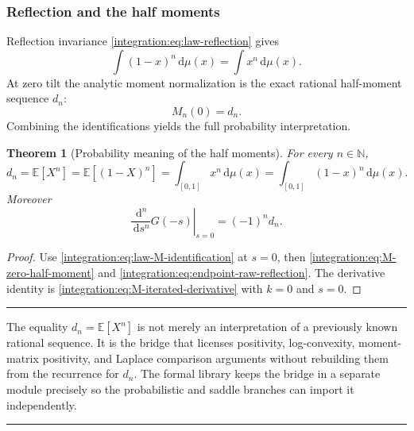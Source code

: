 \documentclass[11pt,oneside]{article}
\newtheorem{theorem}{Theorem}[section]
\theoremstyle{definition}
\theoremstyle{remark}
\newcommand{\N}{\mathbb N}
\newcommand{\dd}{\,\mathrm d}
\newcommand{\E}{\mathbb E}
\newenvironment{boxedremark}{%
  \par\smallskip\noindent\begin{center}\begin{minipage}{0.94\textwidth}%
  \color{black}\hrule\vspace{0.6em}\small
}{%
  \vspace{0.6em}\hrule\end{minipage}\end{center}\smallskip
}
\begin{document}
\subsubsection{Reflection and the half moments}

Reflection invariance \eqref{integration:eq:law-reflection} gives
\begin{equation}
 \int(1-x)^n\dd\mu(x)=\int x^n\dd\mu(x).
 \label{integration:eq:endpoint-raw-reflection}
\end{equation}
At zero tilt the analytic moment normalization is the exact rational half-moment sequence
$d_n$:
\begin{equation}
 M_n(0)=d_n.
 \label{integration:eq:M-zero-half-moment}
\end{equation}
Combining the identifications yields the full probability interpretation.

\begin{theorem}[Probability meaning of the half moments]
\label{integration:thm:half-moments-probability}
For every $n\in\N$,
\begin{equation}
 d_n=\E[X^n]=\E[(1-X)^n]
     =\int_{[0,1]}x^n\dd\mu(x)
     =\int_{[0,1]}(1-x)^n\dd\mu(x).
 \label{integration:eq:half-moment-probability}
\end{equation}
Moreover
\begin{equation}
 \left.\frac{\dd^n}{\dd s^n}G(-s)\right|_{s=0}=(-1)^nd_n.
 \label{integration:eq:generating-jet-half-moments}
\end{equation}
\end{theorem}

\begin{proof}
Use \eqref{integration:eq:law-M-identification} at $s=0$, then
\eqref{integration:eq:M-zero-half-moment} and \eqref{integration:eq:endpoint-raw-reflection}.  The derivative identity
is \eqref{integration:eq:M-iterated-derivative} with $k=0$ and $s=0$.
\end{proof}

\begin{boxedremark}
The equality $d_n=\E[X^n]$ is not merely an interpretation of a previously known rational
sequence.  It is the bridge that licenses positivity, log-convexity, moment-matrix
positivity, and Laplace comparison arguments without rebuilding them from the recurrence for
$d_n$.  The formal library keeps the bridge in a separate module precisely so the
probabilistic and saddle branches can import it independently.
\end{boxedremark}
\end{document}

